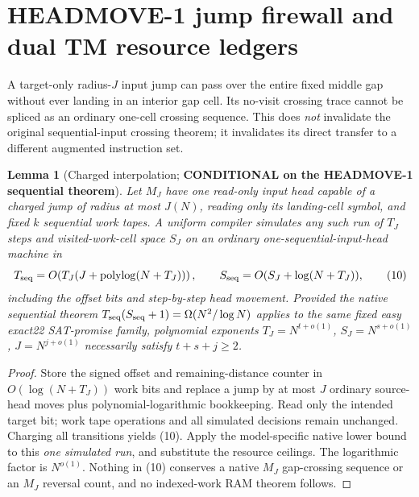 \documentclass[11pt]{article}
\newtheorem{lemma}[theorem]{Lemma}
\begin{document}
\section{HEADMOVE-1 jump firewall and dual TM resource ledgers}
A target-only radius-$J$ input jump can pass over the entire fixed middle gap without ever landing in an interior gap cell. Its no-visit crossing trace cannot be spliced as an ordinary one-cell crossing sequence.  This does \emph{not} invalidate the original sequential-input crossing theorem; it invalidates its direct transfer to a different augmented instruction set.

\begin{lemma}[Charged interpolation; \textbf{CONDITIONAL on the HEADMOVE-1 sequential theorem}]\label{lem:jump}
Let $M_J$ have one read-only input head capable of a charged jump of radius at most $J(N)$, reading only its landing-cell symbol, and fixed $k$ sequential work tapes. A uniform compiler simulates any such run of $T_J$ steps and visited-work-cell space $S_J$ on an ordinary one-sequential-input-head machine in
\[
 T_{\rm seq}=O\!\left(T_J(J+\operatorname{polylog}(N+T_J))\right),\qquad
 S_{\rm seq}=O(S_J+\log(N+T_J)),
\tag{10}
\]
including the offset bits and step-by-step head movement.  Provided the native sequential theorem $T_{\rm seq}(S_{\rm seq}+1)=\Omega(N^2/\log N)$ applies to the same fixed easy exact22 SAT-promise family, polynomial exponents $T_J=N^{t+o(1)}$, $S_J=N^{s+o(1)}$, $J=N^{j+o(1)}$ necessarily satisfy $t+s+j\ge2$.
\end{lemma}
\begin{proof}
Store the signed offset and remaining-distance counter in $O(\log(N+T_J))$ work bits and replace a jump by at most $J$ ordinary source-head moves plus polynomial-logarithmic bookkeeping.  Read only the intended target bit; work tape operations and all simulated decisions remain unchanged. Charging all transitions yields (10). Apply the model-specific native lower bound to this \emph{one simulated run}, and substitute the resource ceilings.  The logarithmic factor is $N^{o(1)}$.  Nothing in (10) conserves a native $M_J$ gap-crossing sequence or an $M_J$ reversal count, and no indexed-work RAM theorem follows.
\end{proof}
\end{document}
